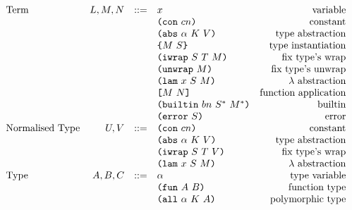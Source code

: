\documentclass[../plutus-core-specification.tex]{subfiles}
\begin{document}
\begin{minipage}{\linewidth}
    \centering
    \[\begin{array}{lrclr}
        \textrm{Term}             & L,M,N  & ::= & x                          & \textrm{variable}\\
                                  &        &     & \texttt{(} \texttt{con} ~ cn \texttt{)}                   & \textrm{constant}\\
                                  &        &     & \texttt{(} \texttt{abs} ~ \alpha ~ K ~ V \texttt{)}         & \textrm{type abstraction}\\
                                  &        &     & \texttt{\{}M ~ S\texttt{\}}                & \textrm{type instantiation}\\
                                  &        &     & \texttt{(} \texttt{iwrap} ~ S ~ T ~ M \texttt{)}             & \textrm{fix type's wrap}\\
                                  &        &     & \texttt{(} \texttt{unwrap} ~ M \texttt{)}                 & \textrm{fix type's unwrap}\\
                                  &        &     & \texttt{(} \texttt{lam} ~ x ~ S ~ M \texttt{)}              & \textrm{$\lambda$ abstraction}\\
                                  &        &     & \texttt{[} M ~ N \texttt{]}                 & \textrm{function application}\\
                                  &        &     & \texttt{(} \texttt{builtin} ~ bn ~ S^* ~ M^* \texttt{)}      & \textrm{builtin}\\
                                  &        &     & \texttt{(} \texttt{error} ~ S \texttt{)}                  & \textrm{error}\\
        \textrm{Normalised Type}  & U, V   & ::= & \texttt{(} \texttt{con} ~ cn \texttt{)}                   & \textrm{constant}\\
                                  &        &     & \texttt{(} \texttt{abs} ~ \alpha ~ K ~ V \texttt{)}         & \textrm{type abstraction}\\
                                  &        &     & \texttt{(} \texttt{iwrap} ~ S ~ T ~ V \texttt{)}             & \textrm{fix type's wrap}\\
                                  &        &     & \texttt{(} \texttt{lam} ~ x ~ S ~ M \texttt{)}              & \textrm{$\lambda$ abstraction}\\
        \textrm{Type}             & A,B,C  & ::= & \alpha                     & \textrm{type variable}\\
                                  &        &     & \texttt{(} \texttt{fun} ~ A ~ B \texttt{)}                & \textrm{function type}\\
                                  &        &     & \texttt{(} \texttt{all} ~ \alpha ~ K ~ A \texttt{)}        & \textrm{polymorphic type}\\

\end{array}\]
\end{minipage}
\end{document}
